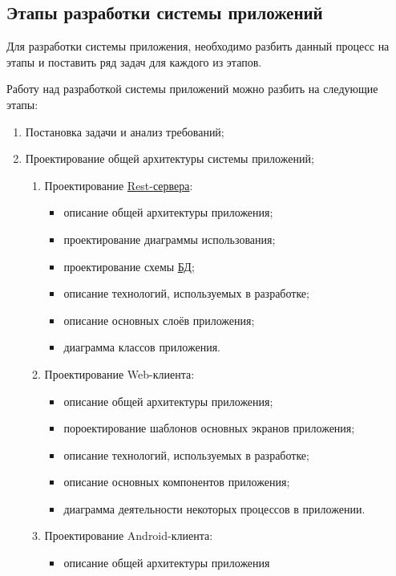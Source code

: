 \subsection{Этапы разработки системы приложений}\label{subsec:2-dev-stages}\indent

Для разработки системы приложения, необходимо разбить данный процесс на этапы и поставить ряд задач для каждого из этапов.

Работу над разработкой системы приложений можно разбить на следующие этапы:

\begin{enumerate}
    \item Постановка задачи и анализ требований;
    \item Проектирование общей архитектуры системы приложений;
    \begin{enumerate}
        \item Проектирование \hyperlink{gloss:rest}{Rest-сервера}:
        \begin{itemize}
            \item описание общей архитектуры приложения;
            \item проектирование диаграммы использования;
            \item проектирование схемы \hyperlink{gloss:db}{БД};
            \item описание технологий, используемых в разработке;
            \item описание основных слоёв приложения;
            \item диаграмма классов приложения.
        \end{itemize}
        \item Проектирование Web-клиента:
        \begin{itemize}
            \item описание общей архитектуры приложения;
            \item пороектирование шаблонов основных экранов приложения;
            \item описание технологий, используемых в разработке;
            \item описание основных компонентов приложения;
            \item диаграмма деятельности некоторых процессов в приложении.
        \end{itemize}
        \item Проектирование Android-клиента:
        \begin{itemize}
            \item описание общей архитектуры приложения

\end{itemize}
\end{enumerate}
\end{enumerate}

